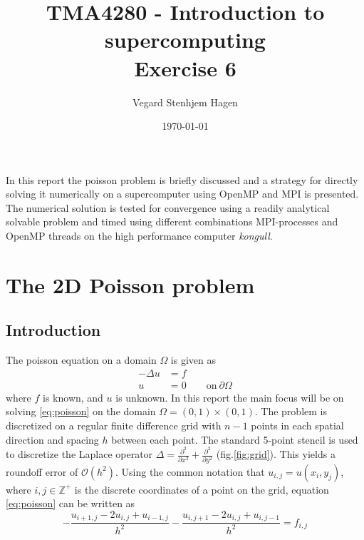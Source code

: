 \documentclass[11pt,a4paper,english]{article}
\title{TMA4280 - Introduction to supercomputing\\Exercise 6}
\author{Vegard Stenhjem Hagen}
\date{\today}
\numberwithin{figure}{subsection}
\numberwithin{table}{subsection}
\begin{document}

\maketitle

\abstract
In this report the poisson problem is briefly discussed and a strategy for
directly solving it numerically on a supercomputer using OpenMP and MPI is
presented. The numerical solution is tested for convergence using a readily
analytical solvable problem and timed using different combinations MPI-processes and OpenMP threads on the high performance computer \textit{kongull}.
\begin{figure}[hb]
	\centering
	\bigskip \bigskip \bigskip
	\bigskip \bigskip \bigskip
	
\end{figure}
	

\newpage
\tableofcontents
\newpage
\section{The 2D Poisson problem}
\subsection{Introduction}
The poisson equation on a domain $\Omega$ is given as 
\begin{equation}
	\begin{aligned}
	-\Delta u & = f \\
	u & = 0 \qquad \textrm{on} \ \partial \Omega
	\end{aligned}
	\label{eq:poisson}
\end{equation}
where $f$ is known, and $u$ is unknown. In this report the main focus will be
on solving \eqref{eq:poisson} on the domain $\Omega = (0,1)\times(0,1)$. The
problem is discretized on a regular finite difference grid with $n-1$ points in
each spatial direction and spacing $h$ between each point. The standard 5-point stencil is used to discretize the Laplace operator $\Delta = \frac{\partial^2}{\partial x^2} + \frac{\partial^2}{\partial y^2}$ (fig.\ref{fig:grid}). This yields a roundoff error of $\mathcal{O}(h^2)$. Using the common notation that $u_{i,j} = u(x_i,y_j)$, where $i,j\in \mathbb{Z}^+$ is the discrete coordinates of a point on the grid, equation \eqref{eq:poisson} can be written as 
\begin{equation}
	\label{eq:discLap}
	-\frac{u_{i+1,j}-2u_{i,j}+u_{i-1,j}}{h^2}-\frac{u_{i,j+1}-2u_{i,j}+u_{i,j-1}}{h^2} = f_{i,j}
\end{equation}
\end{document}
